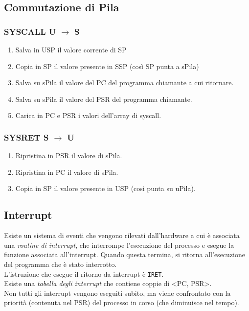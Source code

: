 \documentclass[10pt,a4paper]{article}
\newcommand{\code}{\texttt}
\begin{document}
    \subsection{Commutazione di Pila}
    \subsubsection{SYSCALL U $\rightarrow$ S}
    \begin{enumerate}
        \item Salva in USP il valore corrente di SP
        \item Copia in SP il valore presente in SSP (così SP punta a sPila)
        \item Salva su sPila il valore del PC del programma chiamante a cui ritornare.
        \item Salva su sPila il valore del PSR del programma chiamante.
        \item Carica in PC e PSR i valori dell'array di syscall.
    \end{enumerate}
    \subsubsection{SYSRET S $\rightarrow$ U}\begin{enumerate}
        \item Ripristina in PSR il valore di sPila.
        \item Ripristina in PC il valore di sPila.
        \item Copia in SP il valore presente in USP (così punta su uPila).
    \end{enumerate}
    \subsection{Interrupt}
    Esiste un sistema di eventi che vengono rilevati dall'hardware a cui è associata una \emph{routine di interrupt}, che interrompe l'esecuzione del processo e esegue la funzione associata all'interrupt. Quando questa termina, si ritorna all'esecuzione del programma che è stato interrotto.\\
    L'istruzione che esegue il ritorno da interrupt è \code{IRET}.\\
    Esiste una \emph{tabella degli interrupt} che contiene coppie di <PC, PSR>.\\
    Non tutti gli interrupt vengono eseguiti subito, ma viene confrontato con la priorità (contenuta nel PSR) del processo in corso (che diminuisce nel tempo).
\end{document}
